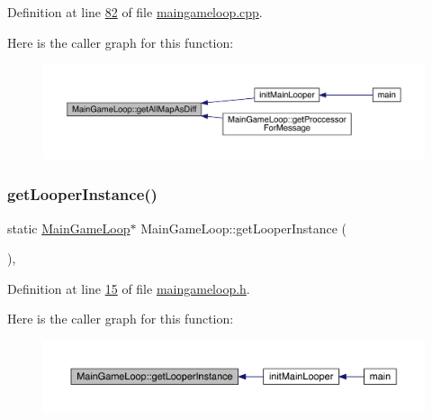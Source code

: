 Definition at line \hyperlink{a00089_source_l00082}{82} of file \hyperlink{a00089_source}{maingameloop.\+cpp}.

Here is the caller graph for this function\+:
\nopagebreak
\begin{figure}[H]
\begin{center}
\leavevmode
\includegraphics[width=350pt]{d3/de5/a00209_ac4cd47d8b350ae45ea09aaecad11a684_icgraph}
\end{center}
\end{figure}
\mbox{\label{a00209_ae4df98e12ba90efd73b144455d9fd52d}} 
\subsubsection{\texorpdfstring{get\+Looper\+Instance()}{getLooperInstance()}}
{\footnotesize\ttfamily static \hyperlink{a00209}{Main\+Game\+Loop}$\ast$ Main\+Game\+Loop\+::get\+Looper\+Instance (\begin{DoxyParamCaption}{ }\end{DoxyParamCaption})\hspace{0.3cm}{\ttfamily [inline]}, {\ttfamily [static]}}



Definition at line \hyperlink{a00092_source_l00015}{15} of file \hyperlink{a00092_source}{maingameloop.\+h}.

Here is the caller graph for this function\+:
\nopagebreak
\begin{figure}[H]
\begin{center}
\leavevmode
\includegraphics[width=350pt]{d3/de5/a00209_ae4df98e12ba90efd73b144455d9fd52d_icgraph}
\end{center}
\end{figure}
\mbox{\label{a00209_ab9de0ceedab969b5f7fd9e1131bc4cd5}} 
